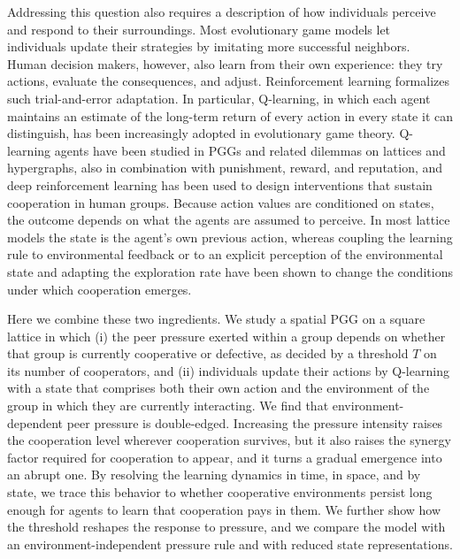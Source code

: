 \documentclass[%
  aip,cha,
  amsmath,amssymb,
  reprint,
  article-title,
]{revtex4-2}
\begin{document}
Addressing this question also requires a description of how individuals perceive and respond to their surroundings.
Most evolutionary game models let individuals update their strategies by imitating more successful neighbors.\cite{szabo2007evolutionary,traulsen2010human}
Human decision makers, however, also learn from their own experience: they try actions, evaluate the consequences, and adjust.\cite{young2009learning}
Reinforcement learning formalizes such trial-and-error adaptation.\cite{sutton2018reinforcement}
In particular, Q-learning,\cite{watkins1992qlearning} in which each agent maintains an estimate of the long-term return of every action in every state it can distinguish, has been increasingly adopted in evolutionary game theory.\cite{xie2026reinforcement,zheng2026brief}
Q-learning agents have been studied in PGGs and related dilemmas on lattices and hypergraphs,\cite{zheng2024evolution,shi2024model,wang2025spatial,mintz2025evolutionary,lee2025granular,li2025cooperation} also in combination with punishment, reward, and reputation,\cite{zhao2024emergence,wang2023synergistic,ren2024interaction} and deep reinforcement learning has been used to design interventions that sustain cooperation in human groups.\cite{mckee2023scaffolding,koster2025deep}
Because action values are conditioned on states, the outcome depends on what the agents are assumed to perceive. In most lattice models the state is the agent's own previous action,\cite{wang2022levy,fan2022incorporating,du2026shaping} whereas coupling the learning rule to environmental feedback\cite{lv2025reinforcement} or to an explicit perception of the environmental state\cite{li2025environmental} and adapting the exploration rate\cite{shen2024adaptive} have been shown to change the conditions under which cooperation emerges.

Here we combine these two ingredients. We study a spatial PGG on a square lattice in which (i) the peer pressure exerted within a group depends on whether that group is currently cooperative or defective, as decided by a threshold $T$ on its number of cooperators, and (ii) individuals update their actions by Q-learning with a state that comprises both their own action and the environment of the group in which they are currently interacting.
We find that environment-dependent peer pressure is double-edged. Increasing the pressure intensity raises the cooperation level wherever cooperation survives, but it also raises the synergy factor required for cooperation to appear, and it turns a gradual emergence into an abrupt one. By resolving the learning dynamics in time, in space, and by state, we trace this behavior to whether cooperative environments persist long enough for agents to learn that cooperation pays in them. We further show how the threshold reshapes the response to pressure, and we compare the model with an environment-independent pressure rule and with reduced state representations.
\end{document}
